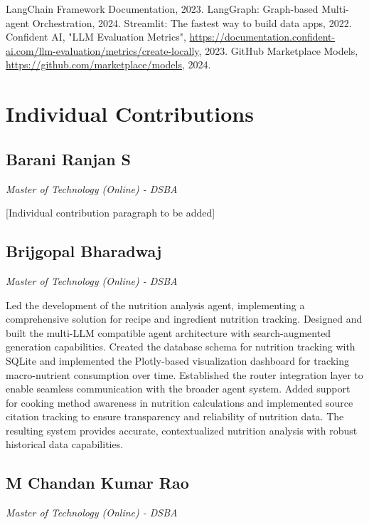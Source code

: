 \documentclass{ecai}
\begin{document}

\begin{thebibliography}{9}
 LangChain Framework Documentation, 2023.
 LangGraph: Graph-based Multi-agent Orchestration, 2024.
 Streamlit: The fastest way to build data apps, 2022.
 Confident AI, "LLM Evaluation Metrics", \url{https://documentation.confident-ai.com/llm-evaluation/metrics/create-locally}, 2023.
 GitHub Marketplace Models, \url{https://github.com/marketplace/models}, 2024.
\end{thebibliography}

\clearpage
\section*{Individual Contributions}

\subsection*{Barani Ranjan S}
\textit{Master of Technology (Online) - DSBA}

[Individual contribution paragraph to be added]

\subsection*{Brijgopal Bharadwaj}
\textit{Master of Technology (Online) - DSBA}

Led the development of the nutrition analysis agent, implementing a comprehensive solution for recipe and ingredient nutrition tracking. Designed and built the multi-LLM compatible agent architecture with search-augmented generation capabilities. Created the database schema for nutrition tracking with SQLite and implemented the Plotly-based visualization dashboard for tracking macro-nutrient consumption over time. Established the router integration layer to enable seamless communication with the broader agent system. Added support for cooking method awareness in nutrition calculations and implemented source citation tracking to ensure transparency and reliability of nutrition data. The resulting system provides accurate, contextualized nutrition analysis with robust historical data capabilities.

\subsection*{M Chandan Kumar Rao}
\textit{Master of Technology (Online) - DSBA}
\end{document}
